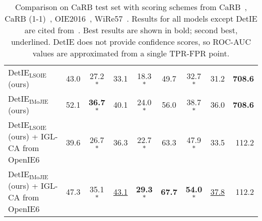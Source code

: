\documentclass[letterpaper]{article} \usepackage{aaai22}  \usepackage{times}  \usepackage{helvet}  \usepackage{courier}  \usepackage[hyphens]{url}  \usepackage{graphicx} \usepackage{placeins}
\begin{document}
\begin{table*}[t]
\begin{tabular}{l|cc|cc|cc|c|r}
        DetIE$_{\mathrm{LSOIE}}$ (ours) & 43.0 & 27.2\textsuperscript{$\ast$} & 33.1 & 18.3\textsuperscript{$\ast$} & 49.7 & 32.7\textsuperscript{$\ast$} & 31.2 & \textbf{708.6} \\ 
        DetIE$_{\mathrm{IMoJIE}}$  (ours)& 52.1 & \textbf{36.7}\textsuperscript{$\ast$} & 40.1 & 24.0\textsuperscript{$\ast$} & 56.0 & 38.7\textsuperscript{$\ast$} & 36.0 & \textbf{708.6}  \\ 
        DetIE$_{\mathrm{LSOIE}}$  (ours) + IGL-CA from OpenIE6 &  39.6 & 26.7\textsuperscript{$\ast$} & 36.3 & 22.7\textsuperscript{$\ast$} & 63.3 & 47.9\textsuperscript{$\ast$} & 33.5 &  112.2\\ 
        DetIE$_{\mathrm{IMoJIE}}$  (ours) + IGL-CA from OpenIE6 & 47.3 & 35.1\textsuperscript{$\ast$} & \underline{43.1} & \textbf{29.3}\textsuperscript{$\ast$} & \textbf{67.7} & \textbf{54.0}\textsuperscript{$\ast$} & \underline{37.8} & 112.2 \\ 
        \bottomrule
    \end{tabular}
    \caption{Comparison on CaRB test set with scoring schemes from CaRB~\cite{bhardwaj-etal-2019-carb}, CaRB (1-1)~\cite{kolluru2020openie6}, OIE2016~\cite{Stanovsky2016EMNLP}, WiRe57~\cite{lechelle2019wire57}. Results for all models except DetIE are cited from~\cite{kolluru2020openie6}. 
    Best results are shown in bold; second best, underlined. DetIE does not provide confidence scores, so ROC-AUC values are approximated from a single TPR-FPR point.}
    \label{tab:carb}
\end{table*}
\end{document}
